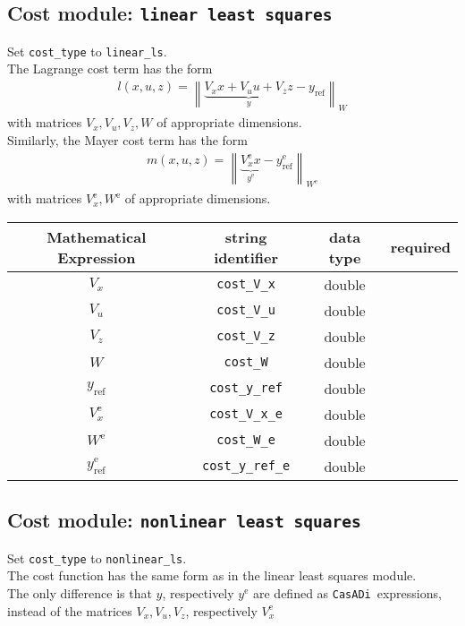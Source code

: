 \documentclass{article}
\newcommand{\code}[1]{\texttt{#1}}
\newcommand{\casadi}{\texttt{CasADi}}
\newcommand{\norm}[1]{\left\lVert#1\right\rVert}
\newcommand{\terminal}{^{\textrm{e}}}
\begin{document}
\subsection*{Cost module: \code{linear least squares}}
Set \code{cost\_type} to \code{linear\_ls}.\\
The Lagrange cost term has the form
\begin{align*}
l(x, u, z) = \norm{ \underbrace{V_x x + V_u u + V_z z}_y - y_{\textrm{ref}}}_W
\end{align*}
with matrices $ V_x, V_u, V_z, W $ of appropriate dimensions.\\
Similarly, the Mayer cost term has the form
\begin{align*}
m(x, u, z) = \norm{ \underbrace{V_x\terminal x}_{y\terminal} - y\terminal_{\textrm{ref}}}_{W\terminal}
\end{align*}
with matrices $ V\terminal_x, W\terminal $ of appropriate dimensions.
\begin{table}[h!]
	\centering
	\begin{tabular}{|c|c|c|c|}
		\toprule
		Mathematical Expression & string identifier & data type & required \\ \midrule
		$ V_x $ & \code{cost\_V\_x}    & double & \mandatory   \\ \midrule
		$ V_u $ & \code{cost\_V\_u}    & double & \mandatory   \\ \midrule
		$ V_z $ & \code{cost\_V\_z}    & double & \mandatory  \\ \midrule
		$ W $ & \code{cost\_W}    & double & \mandatory  \\ \midrule
		$ y_{\textrm{ref}} $ & \code{cost\_y\_ref}    & double & \mandatory   \\ \midrule
		$ V_x\terminal $ & \code{cost\_V\_x\_e}    & double  & \mandatory  \\ \midrule
		$ W\terminal $ & \code{cost\_W\_e}    & double & \mandatory   \\ \midrule
		$ y_{\textrm{ref}}\terminal $ & \code{cost\_y\_ref\_e}   & double & \mandatory   \\
		\bottomrule
	\end{tabular}
\end{table}

\newpage
\subsection*{Cost module: \code{nonlinear least squares}}
Set \code{cost\_type} to \code{nonlinear\_ls}.\\
The cost function has the same form as in the linear least squares module.\\
The only difference is that $ y $, respectively $ y\terminal $ are defined as \casadi~expressions, instead of the matrices $ V_x, V_u, V_z $, respectively $ V_x\terminal $
\end{document}
